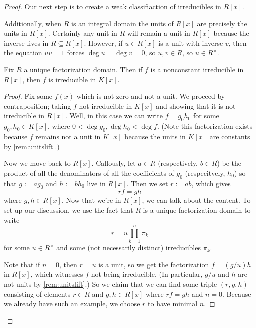 \begin{proof}
	Our next step is to create a weak classifiaction of irreducibles in $R[x]$.
	\begin{remark}[Nir] \label{rem:unitslift}
		Additionally, when $R$ is an integral domain the units of $R[x]$ are precisely the units in $R[x]$. Certainly any unit in $R$ will remain a unit in $R[x]$ because the inverse lives in $R\subseteq R[x]$. However, if $u\in R[x]$ is a unit with inverse $v$, then the equation $uv=1$ forces $\deg u=\deg v=0$, so $u,v\in R$, so $u\in R^\times$.
	\end{remark}
	\begin{lemma} \label{lem:irredfracfield}
		Fix $R$ a unique factorization domain. Then if $f$ is a nonconstant irreducible in $R[x]$, then $f$ is irreducible in $K[x]$.
	\end{lemma}
	\begin{proof}
		Fix some $f(x)$ which is not zero and not a unit. We proceed by contraposition; taking $f$ not irreducible in $K[x]$ and showing that it is not irreducible in $R[x]$. Well, in this case we can write $f=g_0h_0$ for some $g_0,h_0\in K[x]$, where $0<\deg g_0,\deg h_0<\deg f$. (Note this factorization exists because $f$ remains not a unit in $K[x]$ because the units in $K[x]$ are constants by \autoref{rem:unitslift}.)
		
		Now we move back to $R[x]$. Callously, let $a\in R$ (respectively, $b\in R$) be the product of all the denominators of all the coefficients of $g_0$ (respecitvely, $h_0$) so that $g:=ag_0$ and $h:=bh_0$ live in $R[x]$. Then we set $r:=ab$, which gives
		\[rf=gh\]
		where $g,h\in R[x]$. Now that we're in $R[x]$, we can talk about the content. To set up our discussion, we use the fact that $R$ is a unique factorization domain to write
		\[r=u\prod_{k=1}^n\pi_k\]
		for some $u\in R^\times$ and some (not necessarily distinct) irreducibles $\pi_k$.

		Note that if $n=0$, then $r=u$ is a unit, so we get the factorization $f=(g/u)h$ in $R[x]$, which witnesses $f$ not being irreducible. (In particular, $g/u$ and $h$ are not units by \autoref{rem:unitslift}.) So we claim that we can find some triple $(r,g,h)$ consisting of elements $r\in R$ and $g,h\in R[x]$ where $rf=gh$ and $n=0$. Because we already have such an example, we choose $r$ to have minimal $n$.


\end{proof}
\end{proof}

